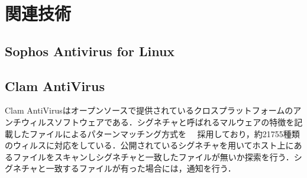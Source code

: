 \section{関連技術}

\subsection{Sophos Antivirus for Linux}

\subsection{Clam AntiVirus}
Clam AntiVirusはオープンソースで提供されているクロスプラットフォームのアンチウィルスソフトウェアである．シグネチャと呼ばれるマルウェアの特徴を記載したファイルによるパターンマッチング方式を　
採用しており，約21755種類のウィルスに対応をしている．公開されているシグネチャを用いてホスト上にあるファイルをスキャンしシグネチャと一致したファイルが無いか探索を行う．シグネチャと一致するファイルが有った場合には，通知を行う．
